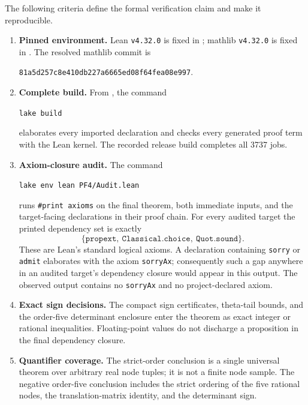 \documentclass[11pt]{article}
\theoremstyle{remark}
\numberwithin{equation}{section}
\begin{document}
The following criteria define the formal verification claim and make it
reproducible.
\begin{enumerate}
\item \textbf{Pinned environment.} Lean \texttt{v4.32.0} is fixed in
; mathlib \texttt{v4.32.0} is fixed in
. The resolved mathlib commit is
\begin{center}
{\footnotesize\texttt{81a5d257c8e410db227a6665ed08f64fea08e997}}.
\end{center}

\item \textbf{Complete build.} From , the command
\begin{center}
\texttt{lake build}
\end{center}
elaborates every imported declaration and checks every generated proof term
with the Lean kernel. The recorded release build completes all 3737 jobs.

\item \textbf{Axiom-closure audit.} The command
\begin{center}
\texttt{lake env lean PF4/Audit.lean}
\end{center}
runs \texttt{\#print axioms} on the final theorem, both immediate inputs, and
the target-facing declarations in their proof chain. For every audited target
the printed dependency set is exactly
\[
 \{\texttt{propext},\ \texttt{Classical.choice},\ \texttt{Quot.sound}\}.
\]
These are Lean's standard logical axioms. A declaration containing
\texttt{sorry} or \texttt{admit} elaborates with the axiom
\texttt{sorryAx}; consequently such a gap anywhere in an audited target's
dependency closure would appear in this output. The observed output contains
no \texttt{sorryAx} and no project-declared axiom.

\item \textbf{Exact sign decisions.} The compact sign certificates, theta-tail
bounds, and the order-five determinant enclosure enter the theorem as exact
integer or rational inequalities. Floating-point values do not discharge a
proposition in the final dependency closure.

\item \textbf{Quantifier coverage.} The strict-order conclusion is a single
universal theorem over arbitrary real node tuples; it is not a finite node
sample. The negative order-five conclusion includes the strict ordering of
the five rational nodes, the translation-matrix identity, and the determinant
sign.
\end{enumerate}
\end{document}
